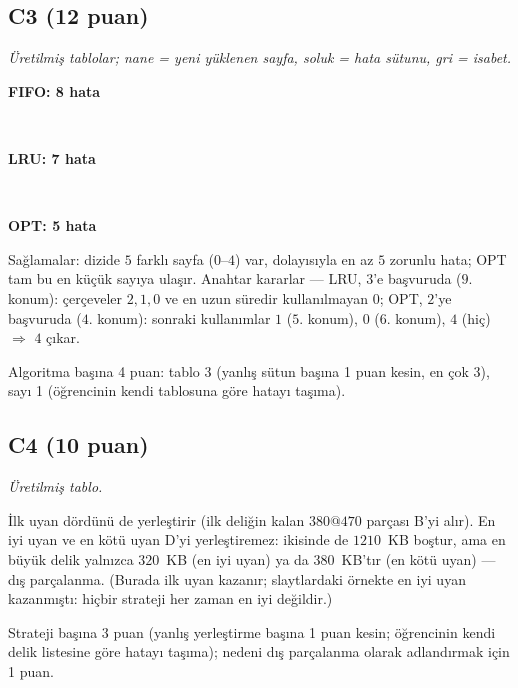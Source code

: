\subsection*{C3 (12 puan)}
\textit{Üretilmiş tablolar; nane = yeni yüklenen sayfa, soluk = hata sütunu, gri = isabet.}
\begin{center}
\begin{minipage}{\linewidth}\centering\textbf{FIFO: 8 hata}\\[0.2em]\end{minipage}\\[0.8em]
\begin{minipage}{\linewidth}\centering\textbf{LRU: 7 hata}\\[0.2em]\end{minipage}\\[0.8em]
\begin{minipage}{\linewidth}\centering\textbf{OPT: 5 hata}\\[0.2em]\end{minipage}
\end{center}
Sağlamalar: dizide $5$ farklı sayfa ($0$--$4$) var, dolayısıyla en az $5$ zorunlu hata; OPT tam bu en küçük sayıya ulaşır. Anahtar kararlar --- LRU, $3$'e başvuruda ($9$. konum): çerçeveler $2, 1, 0$ ve en uzun süredir kullanılmayan $0$; OPT, $2$'ye başvuruda ($4$. konum): sonraki kullanımlar $1$ ($5$. konum), $0$ ($6$. konum), $4$ (hiç) $\Rightarrow$ $4$ çıkar.
\begin{rubric}Algoritma başına 4 puan: tablo 3 (yanlış sütun başına 1 puan kesin, en çok 3), sayı 1 (öğrencinin kendi tablosuna göre hatayı taşıma).\end{rubric}

\subsection*{C4 (10 puan)}
\textit{Üretilmiş tablo.}
\begin{center}\small{}\end{center}
İlk uyan dördünü de yerleştirir (ilk deliğin kalan $380@470$ parçası B'yi alır). En iyi uyan ve en kötü uyan D'yi yerleştiremez: ikisinde de $1210$~KB boştur, ama en büyük delik yalnızca $320$~KB (en iyi uyan) ya da $380$~KB'tır (en kötü uyan) --- dış parçalanma. (Burada ilk uyan kazanır; slaytlardaki örnekte en iyi uyan kazanmıştı: hiçbir strateji her zaman en iyi değildir.)
\begin{rubric}Strateji başına 3 puan (yanlış yerleştirme başına 1 puan kesin; öğrencinin kendi delik listesine göre hatayı taşıma); nedeni dış parçalanma olarak adlandırmak için 1 puan.\end{rubric}

